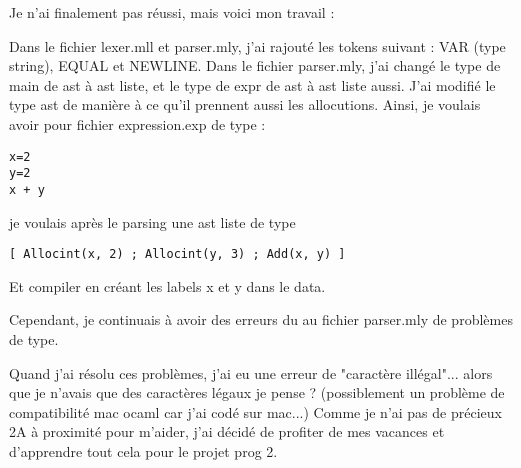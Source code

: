 \documentclass{article}
\begin{document}
Je n'ai finalement pas réussi, mais voici mon travail :


Dans le fichier lexer.mll et parser.mly, j'ai rajouté les tokens suivant : VAR (type string), EQUAL et NEWLINE. Dans le fichier parser.mly, j'ai changé le type de main de ast à ast liste, et le type de expr de ast à ast liste aussi. J'ai modifié le type ast de manière à ce qu'il prennent aussi les allocutions. Ainsi, je voulais avoir pour fichier expression.exp de type :

\begin{verbatim}
x=2
y=2
x + y
\end{verbatim}

je voulais après le parsing une ast liste de type

\begin{verbatim}
[ Allocint(x, 2) ; Allocint(y, 3) ; Add(x, y) ] 
\end{verbatim}

Et compiler en créant les labels x et y dans le data.


Cependant, je continuais à avoir des erreurs du au fichier parser.mly de problèmes de type.


Quand j'ai résolu ces problèmes, j'ai eu une erreur de "caractère illégal"... alors que je n'avais que des caractères légaux je pense ? (possiblement un problème de compatibilité mac ocaml car j'ai codé sur mac...) Comme je n'ai pas de précieux 2A à proximité pour m'aider, j'ai décidé de profiter de mes vacances et d'apprendre tout cela pour le projet prog 2.
\end{document}
